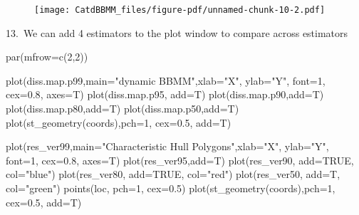 \documentclass[
  letterpaper,
]{book}
\newenvironment{Shaded}{\begin{snugshade}}{\end{snugshade}}
\newcommand{\AttributeTok}[1]{\textcolor[rgb]{0.40,0.45,0.13}{#1}}
\newcommand{\ConstantTok}[1]{\textcolor[rgb]{0.56,0.35,0.01}{#1}}
\newcommand{\DecValTok}[1]{\textcolor[rgb]{0.68,0.00,0.00}{#1}}
\newcommand{\FloatTok}[1]{\textcolor[rgb]{0.68,0.00,0.00}{#1}}
\newcommand{\FunctionTok}[1]{\textcolor[rgb]{0.28,0.35,0.67}{#1}}
\newcommand{\NormalTok}[1]{\textcolor[rgb]{0.00,0.23,0.31}{#1}}
\newcommand{\StringTok}[1]{\textcolor[rgb]{0.13,0.47,0.30}{#1}}
\begin{document}
\begin{figure}[H]

{\centering \texttt{[image: CatdBBMM\_files/figure-pdf/unnamed-chunk-10-2.pdf]}

}

\end{figure}

13.~We can add 4 estimators to the plot window to compare across
estimators

\begin{Shaded}
\begin{Highlighting}[]
\FunctionTok{par}\NormalTok{(}\AttributeTok{mfrow=}\FunctionTok{c}\NormalTok{(}\DecValTok{2}\NormalTok{,}\DecValTok{2}\NormalTok{))}

\FunctionTok{plot}\NormalTok{(diss.map.p99,}\AttributeTok{main=}\StringTok{"dynamic BBMM"}\NormalTok{,}\AttributeTok{xlab=}\StringTok{"X"}\NormalTok{, }\AttributeTok{ylab=}\StringTok{"Y"}\NormalTok{, }\AttributeTok{font=}\DecValTok{1}\NormalTok{, }\AttributeTok{cex=}\FloatTok{0.8}\NormalTok{, }\AttributeTok{axes=}\NormalTok{T)}
\FunctionTok{plot}\NormalTok{(diss.map.p95, }\AttributeTok{add=}\NormalTok{T)}
\FunctionTok{plot}\NormalTok{(diss.map.p90,}\AttributeTok{add=}\NormalTok{T)}
\FunctionTok{plot}\NormalTok{(diss.map.p80,}\AttributeTok{add=}\NormalTok{T)}
\FunctionTok{plot}\NormalTok{(diss.map.p50,}\AttributeTok{add=}\NormalTok{T)}
\FunctionTok{plot}\NormalTok{(}\FunctionTok{st\_geometry}\NormalTok{(coords),}\AttributeTok{pch=}\DecValTok{1}\NormalTok{, }\AttributeTok{cex=}\FloatTok{0.5}\NormalTok{, }\AttributeTok{add=}\NormalTok{T)}

\FunctionTok{plot}\NormalTok{(res\_ver99,}\AttributeTok{main=}\StringTok{"Characteristic Hull Polygons"}\NormalTok{,}\AttributeTok{xlab=}\StringTok{"X"}\NormalTok{, }\AttributeTok{ylab=}\StringTok{"Y"}\NormalTok{, }\AttributeTok{font=}\DecValTok{1}\NormalTok{, }\AttributeTok{cex=}\FloatTok{0.8}\NormalTok{, }\AttributeTok{axes=}\NormalTok{T)}
\FunctionTok{plot}\NormalTok{(res\_ver95,}\AttributeTok{add=}\NormalTok{T)}
\FunctionTok{plot}\NormalTok{(res\_ver90, }\AttributeTok{add=}\ConstantTok{TRUE}\NormalTok{, }\AttributeTok{col=}\StringTok{"blue"}\NormalTok{)}
\FunctionTok{plot}\NormalTok{(res\_ver80, }\AttributeTok{add=}\ConstantTok{TRUE}\NormalTok{, }\AttributeTok{col=}\StringTok{"red"}\NormalTok{)}
\FunctionTok{plot}\NormalTok{(res\_ver50, }\AttributeTok{add=}\NormalTok{T, }\AttributeTok{col=}\StringTok{"green"}\NormalTok{)}
\FunctionTok{points}\NormalTok{(loc, }\AttributeTok{pch=}\DecValTok{1}\NormalTok{, }\AttributeTok{cex=}\FloatTok{0.5}\NormalTok{)}
\FunctionTok{plot}\NormalTok{(}\FunctionTok{st\_geometry}\NormalTok{(coords),}\AttributeTok{pch=}\DecValTok{1}\NormalTok{, }\AttributeTok{cex=}\FloatTok{0.5}\NormalTok{, }\AttributeTok{add=}\NormalTok{T)}


\end{Highlighting}
\end{Shaded}
\end{document}
